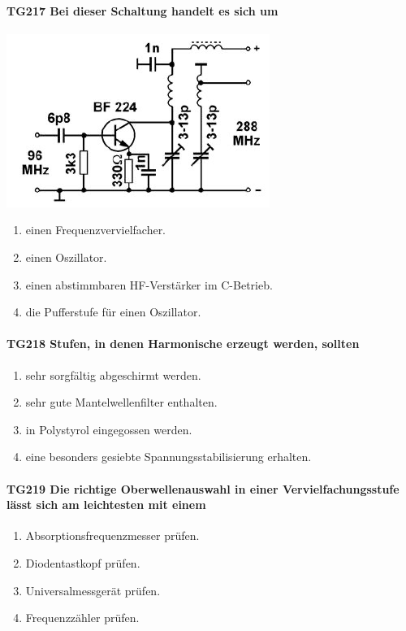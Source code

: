 \documentclass[8pt]{article}
\begin{document}
\paragraph*{TG217 Bei dieser Schaltung handelt es sich um} 
\begin{center}
	\begin{minipage}{\linewidth}
		\centering
		\includegraphics[scale=1.0]{pics/tg217_a.jpg}
	\end{minipage}
\end{center}
\begin{enumerate}[nolistsep,label=\Alph*]
\item einen Frequenzvervielfacher.
\item einen Oszillator.
\item einen abstimmbaren HF-Verstärker im C-Betrieb.
\item die Pufferstufe für einen Oszillator.
\end{enumerate}

\paragraph*{TG218 Stufen, in denen Harmonische erzeugt werden, sollten}
\begin{enumerate}[nolistsep,label=\Alph*]
\item sehr sorgfältig abgeschirmt werden.
\item sehr gute Mantelwellenfilter enthalten.
\item in Polystyrol eingegossen werden.
\item eine besonders gesiebte Spannungsstabilisierung erhalten.
\end{enumerate}

\paragraph*{TG219 Die richtige Oberwellenauswahl in einer Vervielfachungsstufe lässt sich am leichtesten mit einem}
\begin{enumerate}[nolistsep,label=\Alph*]
\item Absorptionsfrequenzmesser prüfen.
\item Diodentastkopf prüfen.
\item Universalmessgerät prüfen.
\item Frequenzzähler prüfen.
\end{enumerate}
\end{document}
